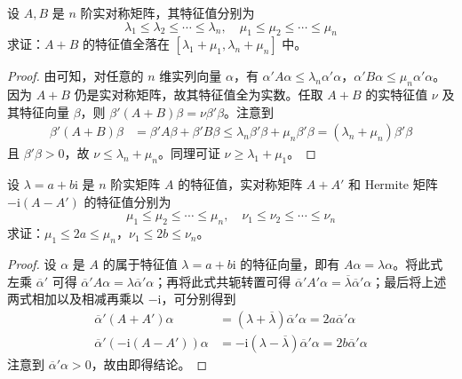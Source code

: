 \documentclass[../../main.tex]{subfiles}
\begin{document}
\begin{example}\label{example:例9.53}
设 \(A,B\) 是 \(n\) 阶实对称矩阵，其特征值分别为
\[
\lambda_1 \leqslant  \lambda_2 \leqslant  \cdots \leqslant  \lambda_n,\quad \mu_1 \leqslant  \mu_2 \leqslant  \cdots \leqslant  \mu_n
\]
求证：\(A + B\) 的特征值全落在 \([\lambda_1 + \mu_1,\lambda_n + \mu_n]\) 中。
\end{example}
\begin{proof}
由可知，对任意的 \(n\) 维实列向量 \(\alpha\)，有 \(\alpha'A\alpha \leqslant  \lambda_n\alpha'\alpha\)，\(\alpha'B\alpha \leqslant  \mu_n\alpha'\alpha\)。因为 \(A + B\) 仍是实对称矩阵，故其特征值全为实数。任取 \(A + B\) 的实特征值 \(\nu\) 及其特征向量 \(\beta\)，则 \(\beta'(A + B)\beta = \nu\beta'\beta\)。注意到
\begin{align*}
\beta'(A + B)\beta &= \beta'A\beta + \beta'B\beta \leqslant  \lambda_n\beta'\beta + \mu_n\beta'\beta = (\lambda_n + \mu_n)\beta'\beta
\end{align*}
且 \(\beta'\beta > 0\)，故 \(\nu \leqslant  \lambda_n + \mu_n\)。同理可证 \(\nu \geqslant  \lambda_1 + \mu_1\)。 
\end{proof}

\begin{example}\label{example:例9.54}
设 \(\lambda = a + b\mathrm{i}\) 是 \(n\) 阶实矩阵 \(A\) 的特征值，实对称矩阵 \(A + A'\) 和 Hermite 矩阵 \(-\mathrm{i}(A - A')\) 的特征值分别为
\[
\mu_1 \leqslant  \mu_2 \leqslant  \cdots \leqslant  \mu_n,\quad \nu_1 \leqslant  \nu_2 \leqslant  \cdots \leqslant  \nu_n
\]
求证：\(\mu_1 \leqslant  2a \leqslant  \mu_n\)，\(\nu_1 \leqslant  2b \leqslant  \nu_n\)。
\end{example}
\begin{proof}
设 \(\alpha\) 是 \(A\) 的属于特征值 \(\lambda = a + b\mathrm{i}\) 的特征向量，即有 \(A\alpha = \lambda\alpha\)。将此式左乘 \(\overline{\alpha}'\) 可得 \(\overline{\alpha}'A\alpha = \lambda\overline{\alpha}'\alpha\)；再将此式共轭转置可得 \(\overline{\alpha}'A'\alpha = \overline{\lambda}\overline{\alpha}'\alpha\)；最后将上述两式相加以及相减再乘以 \(-\mathrm{i}\)，可分别得到
\begin{align*}
\overline{\alpha}'(A + A')\alpha &= (\lambda + \overline{\lambda})\overline{\alpha}'\alpha = 2a\overline{\alpha}'\alpha\\
\overline{\alpha}'(-\mathrm{i}(A - A'))\alpha &= -\mathrm{i}(\lambda - \overline{\lambda})\overline{\alpha}'\alpha = 2b\overline{\alpha}'\alpha
\end{align*}
注意到 \(\overline{\alpha}'\alpha > 0\)，故由即得结论。 
\end{proof}
\end{document}
